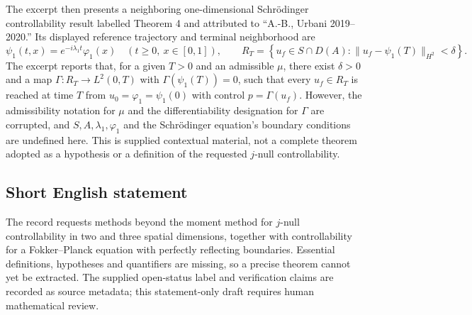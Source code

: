 \documentclass[11pt]{article}
\begin{document}
The excerpt then presents a neighboring one-dimensional Schr\"odinger controllability result labelled Theorem 4 and attributed to ``A.-B., Urbani 2019--2020.'' Its displayed reference trajectory and terminal neighborhood are
\[
\psi_1(t,x)=e^{-i\lambda_1t}\varphi_1(x)
\quad(t\geq0,\ x\in[0,1]),
\qquad
R_T=\left\{u_f\in S\cap D(A):
\|u_f-\psi_1(T)\|_{H^2}<\delta\right\}.
\]
The excerpt reports that, for a given \(T>0\) and an admissible \(\mu\), there exist \(\delta>0\) and a map \(\Gamma:R_T\to L^2(0,T)\) with \(\Gamma(\psi_1(T))=0\), such that every \(u_f\in R_T\) is reached at time \(T\) from \(u_0=\varphi_1=\psi_1(0)\) with control \(p=\Gamma(u_f)\). However, the admissibility notation for \(\mu\) and the differentiability designation for \(\Gamma\) are corrupted, and \(S,A,\lambda_1,\varphi_1\) and the Schr\"odinger equation's boundary conditions are undefined here. This is supplied contextual material, not a complete theorem adopted as a hypothesis or a definition of the requested \(j\)-null controllability.
\subsection{Short English statement}
The record requests methods beyond the moment method for \(j\)-null controllability in two and three spatial dimensions, together with controllability for a Fokker--Planck equation with perfectly reflecting boundaries. Essential definitions, hypotheses and quantifiers are missing, so a precise theorem cannot yet be extracted. The supplied open-status label and verification claims are recorded as source metadata; this statement-only draft requires human mathematical review.
\end{document}
